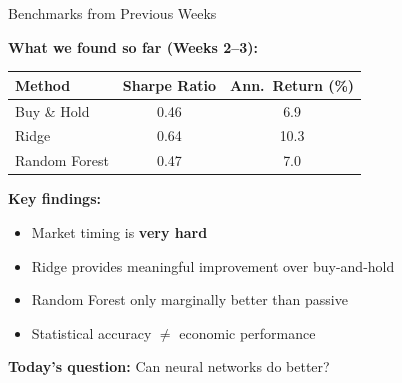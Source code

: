 \documentclass[10pt]{beamer}
\newcommand{\highlight}[1]{\textcolor{AccentOrange}{\textbf{#1}}}
\begin{document}
\begin{frame}{Benchmarks from Previous Weeks}

  \textbf{What we found so far (Weeks 2--3):}

  \vspace{0.5em}
  \begin{center}
  \begin{tabular}{lcc}
    \toprule
    \textbf{Method} & \textbf{Sharpe Ratio} & \textbf{Ann.\ Return (\%)} \\
    \midrule
    Buy \& Hold & 0.46 & 6.9 \\
    Ridge & 0.64 & 10.3 \\
    Random Forest & 0.47 & 7.0 \\
    \bottomrule
  \end{tabular}
  \end{center}

  \vspace{1em}
  \textbf{Key findings:}
  \begin{itemize}
    \item Market timing is \highlight{very hard}
    \item Ridge provides meaningful improvement over buy-and-hold
    \item Random Forest only marginally better than passive
    \item Statistical accuracy $\neq$ economic performance
  \end{itemize}

  \vspace{0.5em}
  \textbf{Today's question:} Can neural networks do better?
\end{frame}

\end{document}
